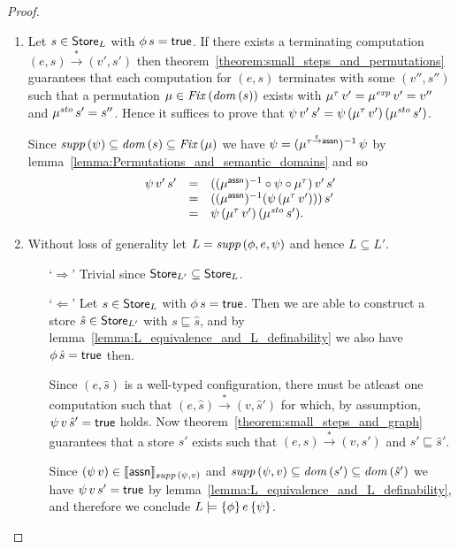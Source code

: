 \documentclass[12pt,a4paper]{report}
\newcommand{\sexp}{\nstyle{exp}}
\newcommand{\ssto}{\nstyle{sto}}
\newcommand{\Fix}[1]{\nstyle{Fix}\,(#1)}
\begin{document}
\begin{proof} \
  \begin{enumerate}
    \item Let $s \in \mathsf{Store}_L$ with $\phi\,s = \mathsf{true}$. If there exists a terminating computation $(e,s) \xrightarrow* (v',s')$
          then theorem~\ref{theorem:small_steps_and_permutations} guarantees that each computation for $(e,s)$
          terminates with some $(v'',s'')$ such that a permutation $\mu\in\Fix{\dom{s}}$ exists with
          $\mu^\tau\,v' = \mu^\sexp\,v' = v''$ and $\mu^\ssto\,s' = s''$.
          Hence it suffices to prove that $\psi\,v'\,s' = \psi\,(\mu^\tau\,v')\,(\mu^\ssto\,s')$.

          Since $\supp{\psi} \subseteq \dom{s} \subseteq \Fix{\mu}$ we have $\psi = (\mu^{\tau\stackrel{_t}{\to}\mathsf{assn}})^{-1}\,\psi$ by
          lemma~\ref{lemma:Permutations_and_semantic_domains} and so
          \[\begin{array}{rcl}
            \psi\,v'\,s' &=& ((\mu^\tassn)^{-1} \circ \psi \circ \mu^\tau)\,v'\,s' \\
                         &=& ((\mu^\tassn)^{-1} (\psi\,(\mu^\tau\,v')))\,s' \\
                         &=& \psi\,(\mu^\tau\,v')\,(\mu^\ssto\,s').
          \end{array}\]

    \item Without loss of generality let $L= \mathit{supp}\,(\phi,e,\psi)$ and hence $L \subseteq L'$.
          \begin{itemize}
            \item[`$\Rightarrow$']
                  Trivial since $\mathsf{Store}_{L'} \subseteq \mathsf{Store}_L$.

            \item[`$\Leftarrow$']
                  Let $s \in \mathsf{Store}_L$ with $\phi\,s = \mathsf{true}$. Then we are able to construct a store $\hat{s}\in\mathsf{Store}_{L'}$
                  with $s \sqsubseteq \hat{s}$, and by lemma~\ref{lemma:L_equivalence_and_L_definability}
                  we also have $\phi\,\hat{s}=\mathsf{true}$ then.

                  Since $(e,\hat{s})$ is a well-typed configuration, there must be atleast one computation such that
                  $(e,\hat{s}) \xrightarrow* (v,\hat{s}')$ for which, by assumption, $\psi\,v\,\hat{s}'=\mathsf{true}$ holds.
                  Now theorem~\ref{theorem:small_steps_and_graph} guarantees that a store $s'$ exists such that
                  $(e,s) \xrightarrow* (v,s')$ and $s' \sqsubseteq \hat{s}'$.

                  Since $(\psi\,v) \in \llbracket\mathsf{assn}\rrbracket_{\mathit{supp}\,(\psi,v)}$ and 
                  $\mathit{supp}\,(\psi,v)\subseteq\mathit{dom}\,(s')\subseteq\mathit{dom}\,(\hat{s}')$ we have $\psi\,v\,s' = \mathsf{true}$ by
                  lemma~\ref{lemma:L_equivalence_and_L_definability},
                  and therefore we conclude $L\models\{\phi\}\,e\,\{\psi\}$.
          \end{itemize}
  \end{enumerate}
\end{proof}
\end{document}
